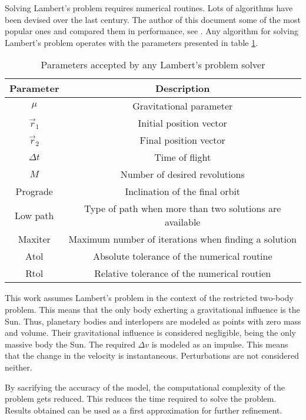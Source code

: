 Solving Lambert's problem requires numerical routines. Lots of algorithms have
been devised over the last century. The author of this document some of the most
popular ones and compared them in performance, see \cite{martinez2021}. Any
algorithm for solving Lambert's problem operates with the parameters presented
in table \ref{tab:lambert-parameters}.

\vspace{1cm}
\begin{table}[H]
    \centering
    \begin{tabular}{|c|c|}
        \hline
        Parameter & Description \\
        \hline
        $\mu$ & Gravitational parameter \\
        $\vec{r}_1$ & Initial position vector \\
        $\vec{r}_2$ & Final position vector \\
        $\Delta t$ & Time of flight \\
        $M$ & Number of desired revolutions \\
        Prograde & Inclination of the final orbit \\
        Low path & Type of path when more than two solutions are available \\
        Maxiter & Maximum number of iterations when finding a solution \\
        Atol & Absolute tolerance of the numerical routine \\
        Rtol & Relative tolerance of the numerical routien \\
        \hline
    \end{tabular}
    \caption{Parameters accepted by any Lambert's problem solver}
    \label{tab:lambert-parameters}
\end{table}

This work assumes Lambert's problem in the context of the restricted two-body
problem. This means that the only body exherting a gravitational influence is
the Sun. Thus, planetary bodies and interlopers are modeled as points with zero
mass and volume. Their gravitational influence is considered negligible, being
the only massive body the Sun. The required $\Delta v$ is modeled as an impulse.
This means that the change in the velocity is instantaneous. Perturbations are
not considered neither.

By sacrifying the accuracy of the model, the computational complexity of the
problem gets reduced. This reduces the time required to solve the problem.
Results obtained can be used as a first approximation for further refinement.
